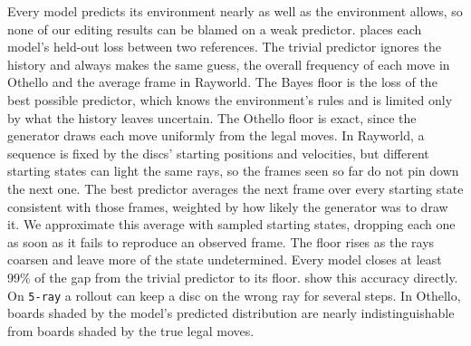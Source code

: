 \documentclass{article} %
\begin{document}
Every model predicts its environment nearly as well as the environment allows, so none of our editing results can be blamed on a weak predictor.  places each model's held-out loss between two references. The trivial predictor ignores the history and always makes the same guess, the overall frequency of each move in Othello and the average frame in Rayworld. The Bayes floor is the loss of the best possible predictor, which knows the environment's rules and is limited only by what the history leaves uncertain. The Othello floor is exact, since the generator draws each move uniformly from the legal moves. In Rayworld, a sequence is fixed by the discs' starting positions and velocities, but different starting states can light the same rays, so the frames seen so far do not pin down the next one. The best predictor averages the next frame over every starting state consistent with those frames, weighted by how likely the generator was to draw it. We approximate this average with sampled starting states, dropping each one as soon as it fails to reproduce an observed frame. The floor rises as the rays coarsen and leave more of the state undetermined. Every model closes at least 99\% of the gap from the trivial predictor to its floor.  show this accuracy directly. On \texttt{5-ray} a rollout can keep a disc on the wrong ray for several steps. In Othello, boards shaded by the model's predicted distribution are nearly indistinguishable from boards shaded by the true legal moves.
\end{document}
